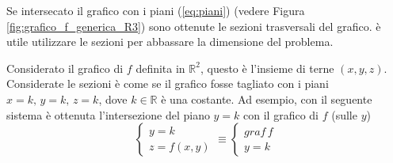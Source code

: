 Se intersecato il grafico con i piani (\ref{eq:piani}) (vedere Figura \ref{fig:grafico_f_generica_R3}) sono ottenute le sezioni trasversali del grafico. è utile utilizzare le sezioni per abbassare la dimensione del problema.

Considerato il grafico di $f$ definita in $\mathbb R^2$, questo è l'insieme di terne $(x,y,z)$. Considerate le sezioni è come se il grafico fosse tagliato con i piani $x=k,\, y=k,\, z=k$, dove $k\in\mathbb R$ è una costante. Ad esempio, con il seguente sistema è ottenuta l'intersezione del piano $y=k$ con il grafico di $f$ (sulle $y$)
\begin{equation*}
    \begin{cases}
        y=k\\
        z=f(x,y)
    \end{cases}\equiv
    \begin{cases}
        graf\,f\\
        y=k
    \end{cases}
\end{equation*}

